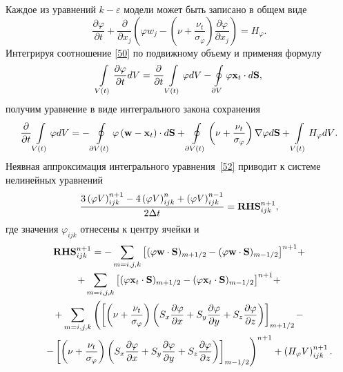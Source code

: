 Каждое из уравнений $k-\varepsilon$ модели может быть записано в общем виде
\begin{equation}
  \label{50} 
  \frac{{\partial \varphi }}{{\partial t}} + \frac{\partial }{{\partial x_j }}\left( {\varphi w_j - 
  \left( {\nu  + \frac{{\nu _t }}{{\sigma _\varphi  }}} 
  \right)\frac{{\partial \varphi }}{{\partial x_j }}} \right) = H_\varphi.
\end{equation}
Интегрируя соотношение \eqref{50} по подвижному объему и применяя формулу
\begin{equation}
  \label{51} 
  \int\limits_{V(t)} {\frac{{\partial \varphi }}{{\partial t}}} dV = \frac{\partial }
  {{\partial t}}\int\limits_{V(t)} \varphi  dV - \displaystyle\oint\limits_{\partial V} 
  {\varphi {\bf{x}}_t  \cdot d{\bf{S}}},
\end{equation}
получим уравнение в виде интегрального закона сохранения
\begin{equation}
  \label{52} 
  \frac{\partial }{{\partial t}}\int\limits_{V(t)} \varphi dV = - 
  \displaystyle\oint\limits_{\partial V(t)} {\varphi \left( {{\bf{w}} - {\bf{x}}_t } 
  \right)\cdot d{\bf{S}}}  + \displaystyle\oint\limits_{\partial V(t)} {\left( {\nu + 
  \frac{{\nu _t }}{{\sigma _\varphi  }}} \right)\nabla \varphi d{\bf{S}}}  + 
  \int\limits_{V(t)} {H_\varphi dV}.
\end{equation}
Неявная аппроксимация интегрального уравнения~\eqref{52} приводит к системе нелинейных уравнений
\begin{equation}
  \label{53} 
  \frac{{3\left( {\varphi V} \right)_{ijk}^{n + 1} - 4\left( {\varphi V} \right)_{ijk}^n  + 
  \left( {\varphi V} \right)_{ijk}^{n - 1} }}{{2\Delta t}} = {\bf{RHS}}_{ijk}^{n + 1},
\end{equation}
где значения  $\varphi_{ijk}$ отнесены к центру ячейки и
\begin{gather}
  \label{54}
  {\bf{RHS}}_{ijk}^{n + 1} = - \sum\limits_{m = i,j,k} {\left[ {(\varphi {\bf{w}} 
  \cdot {\bf{S}})_{m + 1/2} - (\varphi {\bf{w}} \cdot {\bf{S}})_{m - 1/2} } \right]^{n + 1} }+ \notag\\
  + \sum\limits_{m = i,j,k} {\left[ {(\varphi {\bf{x}}_t  \cdot {\bf{S}})_{m + 1/2}  - (
  \varphi {\bf{x}}_t  \cdot {\bf{S}})_{m - 1/2} } \right]^{n + 1} } +\notag \\
  + \sum\limits_{m = i,j,k} {\left( {\left[ {\left( {\nu  + \frac{{\nu _t }}{{\sigma_\varphi  }}} \right)
  \left( {S_x \frac{{\partial \varphi }}{{\partial x}} + S_y \frac{{\partial \varphi }}{{\partial y}} + S_z 
  \frac{{\partial \varphi }}{{\partial z}}} \right)} \right]_{m + 1/2} } \right.}  - \notag \\
  \quad \quad \left. { - \left[ {\left( {\nu  + \frac{{\nu _t }}{{\sigma _\varphi  }}} \right)
  \left( {S_x \frac{{\partial \varphi }}{{\partial x}} + S_y \frac{{\partial \varphi }}{{\partial y}} + S_z 
  \frac{{\partial \varphi }}{{\partial z}}} \right)} \right]_{m - 1/2} } \right)^{n + 1}  + 
  \left( {H_\varphi V} \right)_{ijk}^{n + 1}.
\end{gather}
